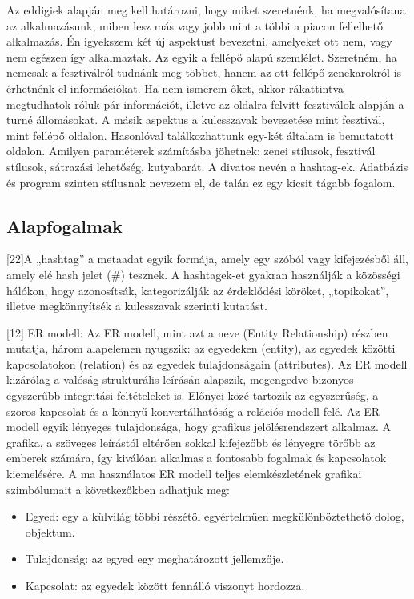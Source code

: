 Az eddigiek alapján meg kell határozni, hogy miket szeretnénk, ha megvalósítana az alkalmazásunk, miben lesz más vagy jobb mint a többi a piacon fellelhető alkalmazás. Én igyekszem két új aspektust bevezetni, amelyeket ott nem, vagy nem egészen így alkalmaztak. Az egyik a fellépő alapú szemlélet. Szeretném, ha nemcsak a fesztiválról tudnánk meg többet, hanem az ott fellépő zenekarokról is érhetnénk el információkat. Ha nem ismerem őket, akkor rákattintva megtudhatok róluk pár információt, illetve az oldalra felvitt fesztiválok alapján a turné állomásokat. A másik aspektus a kulcsszavak bevezetése mint fesztivál, mint fellépő oldalon. Hasonlóval találkozhattunk egy-két általam is bemutatott oldalon. Amilyen paraméterek számításba jöhetnek: zenei stílusok, fesztivál stílusok, sátrazási lehetőség, kutyabarát. A divatos nevén a hashtag-ek. Adatbázis és program szinten stílusnak nevezem el, de talán ez egy kicsit tágabb fogalom.

\subsection{Alapfogalmak}

[22]A „hashtag” a metaadat egyik formája, amely egy szóból vagy kifejezésből áll, amely elé hash jelet (\#) tesznek. A hashtagek-et gyakran használják a közösségi hálókon, hogy azonosítsák, kategorizálják az érdeklődési köröket, „topikokat”, illetve megkönnyítsék a kulcsszavak szerinti kutatást.

[12] ER modell: Az ER modell, mint azt a neve (Entity Relationship) részben mutatja, három alapelemen nyugszik: az egyedeken (entity), az egyedek közötti kapcsolatokon (relation) és az egyedek tulajdonságain (attributes). Az ER modell kizárólag a valóság strukturális leírásán alapszik, megengedve bizonyos egyszerűbb integritási feltételeket is. Előnyei közé tartozik az egyszerűség, a szoros kapcsolat és a könnyű konvertálhatóság a relációs modell felé.
Az ER modell egyik lényeges tulajdonsága, hogy grafikus jelölésrendszert alkalmaz. A grafika, a szöveges leírástól eltérően sokkal kifejezőbb és lényegre törőbb az emberek számára, így kiválóan alkalmas a fontosabb fogalmak és kapcsolatok kiemelésére. A ma használatos ER modell teljes elemkészletének grafikai szimbólumait a következőkben adhatjuk meg:
\begin{itemize}
\item Egyed: egy a külvilág többi részétől egyértelműen megkülönböztethető dolog, objektum. 
\item Tulajdonság: az egyed egy meghatározott jellemzője.
\item Kapcsolat: az egyedek között fennálló viszonyt hordozza.
\end{itemize}

